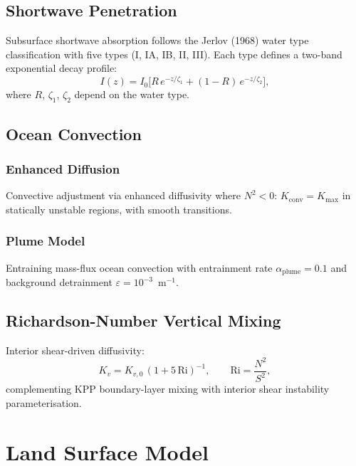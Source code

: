 \documentclass[11pt,twoside]{report}
\begin{document}
\section{Shortwave Penetration}

Subsurface shortwave absorption follows the Jerlov (1968) water type classification with five types (I, IA, IB, II, III).  Each type defines a two-band exponential decay profile:
\begin{equation}
  I(z) = I_0\bigl[R\,e^{-z/\zeta_1} + (1-R)\,e^{-z/\zeta_2}\bigr],
\end{equation}
where $R$, $\zeta_1$, $\zeta_2$ depend on the water type.

\section{Ocean Convection}

\subsection{Enhanced Diffusion}
Convective adjustment via enhanced diffusivity where $N^2 < 0$:
$K_{\mathrm{conv}} = K_{\mathrm{max}}$ in statically unstable regions, with smooth transitions.

\subsection{Plume Model}
Entraining mass-flux ocean convection with entrainment rate $\alpha_{\mathrm{plume}}=0.1$ and background detrainment $\varepsilon=10^{-3}$~m$^{-1}$.

\section{Richardson-Number Vertical Mixing}

Interior shear-driven diffusivity:
\begin{equation}
  K_v = K_{v,0}\,(1 + 5\,\mathrm{Ri})^{-1},
  \qquad \mathrm{Ri} = \frac{N^2}{S^2},
\end{equation}
complementing KPP boundary-layer mixing with interior shear instability parameterisation.


\chapter{Land Surface Model}
\label{ch:land}
\end{document}
